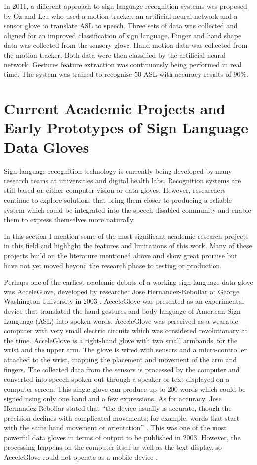 In 2011, a different approach to sign language recognition systems was proposed by Oz and Leu \parencite{Oz2011} who used a motion tracker, an artificial neural network and a sensor glove to translate ASL to speech. Three sets of data was collected and aligned for an improved classification of sign language. Finger and hand shape data was collected from the sensory glove. Hand motion data was collected from the motion tracker. Both data were then classified by the artificial neural network. Gestures feature extraction was continuously being performed in real time. The system was trained to recognize 50 ASL with accuracy results of 90\%. 


\section{Current Academic Projects and Early Prototypes of Sign Language Data Gloves}

Sign language recognition technology is currently being developed by many research teams at universities and digital health labs. Recognition systems are still based on either computer vision or data gloves. However, researchers continue to explore solutions that bring them closer to producing a reliable system which could be integrated into the speech-disabled community and enable them to express themselves more naturally.

In this section I mention some of the most significant academic research projects in this field and highlight the features and limitations of this work. Many of these projects build on the literature mentioned above and show great promise but have not yet moved beyond the research phase to testing or production.

Perhaps one of the earliest academic debuts of a working sign language data glove was AcceleGlove, developed by researcher Jose Hernandez-Rebollar at George Washington University in 2003 \parencite{AcceleGlove2016}. AcceleGlove was presented as an experimental device that translated the hand gestures and body language of American Sign Language (ASL) into spoken words. AcceleGlove was perceived as a wearable computer with very small electric circuits which was considered revolutionary at the time. AcceleGlove is a right-hand glove with two small armbands, for the wrist and the upper arm. The glove is wired with sensors and a micro-controller attached to the wrist, mapping the placement and movement of the arm and fingers. The collected data from the sensors is processed by the computer and converted into speech spoken out through a speaker or text displayed on a computer screen. This single glove can produce up to 200 words which could be signed using only one hand and a few expressions. As for accuracy, Jose Hernandez-Rebollar stated that ``the device usually is accurate, though the precision declines with complicated movements; for example, words that start with the same hand movement or orientation''  \parencite{AcceleGlove2016}. This was one of the most powerful data gloves in terms of output to be published in 2003. However, the processing happens on the computer itself as well as the text display, so AcceleGlove could not operate as a mobile device \parencite{AcceleGlove2016}. 


